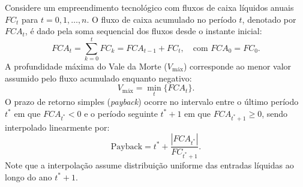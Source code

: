 \begin{boxFormula}
  Considere um empreendimento tecnológico com fluxos de caixa líquidos anuais $FC_t$ para $t = 0, 1, \dots, n$. O fluxo de caixa acumulado no período $t$, denotado por $FCA_t$, é dado pela soma sequencial dos fluxos desde o instante inicial:
  \[
    FCA_t = \sum_{k=0}^{t} FC_k = FCA_{t-1} + FC_t, \quad \text{com } FCA_0 = FC_0.
  \]
  A profundidade máxima do Vale da Morte ($V_{\text{máx}}$) corresponde ao menor valor assumido pelo fluxo acumulado enquanto negativo:
  \[
    V_{\text{máx}} = \min_{t} \{FCA_t\}.
  \]
  O prazo de retorno simples (\textit{payback}) ocorre no intervalo entre o último período $t^*$ em que $FCA_{t^*} < 0$ e o período seguinte $t^* + 1$ em que $FCA_{t^*+1} \ge 0$, sendo interpolado linearmente por:
  \[
    \text{Payback} = t^* + \frac{|FCA_{t^*}|}{FC_{t^*+1}}.
  \]
  Note que a interpolação assume distribuição uniforme das entradas líquidas ao longo do ano $t^*+1$.
\end{boxFormula}


